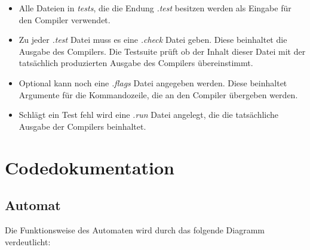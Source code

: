 \documentclass[a4paper,11pt,titlepage,openany,oneside]{scrbook}
\begin{document}
\begin{itemize}
  \item Alle Dateien in \textit{tests}, die die Endung \textit{.test} besitzen werden als Eingabe für den Compiler verwendet.
  \item Zu jeder \textit{.test} Datei muss es eine \textit{.check} Datei geben. Diese beinhaltet die Ausgabe des Compilers. Die Testsuite prüft ob der Inhalt dieser Datei mit der tatsächlich produzierten Ausgabe des Compilers übereinstimmt.
  \item Optional kann noch eine \textit{.flags} Datei angegeben werden. Diese beinhaltet Argumente für die Kommandozeile, die an den Compiler übergeben werden.
  \item Schlägt ein Test fehl wird eine \textit{.run} Datei angelegt, die die tatsächliche Ausgabe der Compilers beinhaltet.
\end{itemize}

\chapter{Codedokumentation}

\section{Automat}
Die Funktionsweise des Automaten wird durch das folgende Diagramm verdeutlicht:
\end{document}
